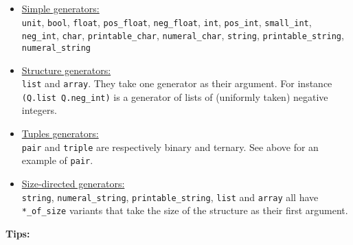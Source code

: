\begin{itemize}
\item  \underline{Simple generators:}\\
\texttt{unit}, \texttt{bool}, \texttt{float}, \texttt{pos\_float},
\texttt{neg\_float}, \texttt{int}, \texttt{pos\_int}, \texttt{small\_int},
\texttt{neg\_int}, \texttt{char}, \texttt{printable\_char}, \texttt{numeral\_char},
\texttt{string}, \texttt{printable\_string},
\texttt{numeral\_string}

\item \underline{Structure generators:}\\
\texttt{list} and \texttt{array}. They take one generator as their argument. For instance
\texttt{(Q.list Q.neg\_int)} is a generator of lists of (uniformly taken) negative integers.

\item \underline{Tuples generators:}\\
\texttt{pair} and \texttt{triple} are respectively binary and ternary. See above for an example of
\texttt{pair}.

\item \underline{Size-directed generators:}\\
\texttt{string}, \texttt{numeral\_string}, \texttt{printable\_string}, \texttt{list}
and \texttt{array} all have \texttt{*\_of\_size}
variants that take the size of the structure as their first argument.
\end{itemize}

\textbf{Tips:}

